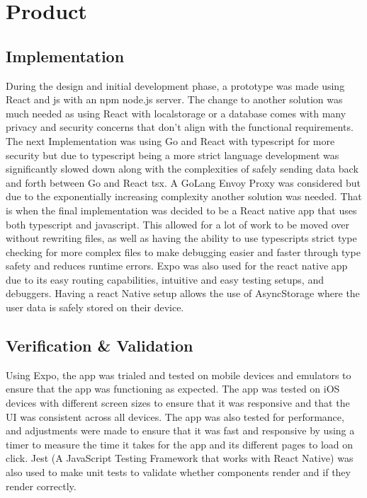 \section{Product}\label{product}

\subsection{Implementation}
During the design and initial development phase, a prototype was made using React and js with an npm node.js server. The change to another solution was much needed as using React with localstorage or a database comes with many privacy and security concerns that don't align with the functional requirements. The next Implementation was using Go and React with typescript for more security but due to typescript being a more strict language development was significantly slowed down along with the complexities of safely sending data back and forth between Go and React tsx. A GoLang Envoy Proxy was considered but due to the exponentially increasing complexity another solution was needed. That is when the final implementation was decided to be a React native app that uses both typescript and javascript. This allowed for a lot of work to be moved over without rewriting files, as well as having the ability to use typescripts strict type checking for more complex files to make debugging easier and faster through type safety and reduces runtime errors. Expo was also used for the react native app due to its easy routing capabilities, intuitive and easy testing setups, and debuggers. Having a react Native setup allows the use of AsyncStorage where the user data is safely stored on their device.

\subsection{Verification \& Validation}
Using Expo, the app was trialed and tested on mobile devices and emulators to ensure that the app was functioning as expected. The app was tested on iOS devices with different screen sizes to ensure that it was responsive and that the UI was consistent across all devices. The app was also tested for performance, and adjustments were made to ensure that it was fast and responsive by using a timer to measure the time it takes for the app and its different pages to load on click. Jest (A JavaScript Testing Framework that works with React Native) was also used to make unit tests to validate whether components render and if they render correctly.

